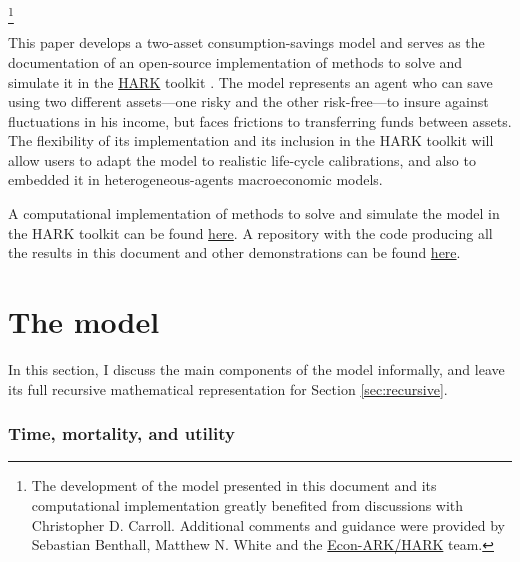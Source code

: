 \documentclass[./RiskyContrib.tex]{subfiles}
\begin{document}
\begin{authorsinfo}
\end{authorsinfo}

\thanks{
The development of the model presented in this document and its computational implementation
greatly benefited from discussions with Christopher D. Carroll. Additional comments and guidance
were provided by Sebastian Benthall, Matthew N. White and the \href{https://econ-ark/HARK}{Econ-ARK/HARK}
team.
}

\titlepagefinish

This paper develops a two-asset consumption-savings model and serves as
the documentation of an open-source implementation of methods to solve and
simulate it in the \href{https://econ-ark.org/toolkit}{HARK}
toolkit \citep{carroll2018HARK}. The model represents an agent who can
save using two different assets---one risky and the other risk-free---to insure
against fluctuations in his income, but faces frictions to transferring funds between
assets. The flexibility of its implementation and its inclusion in the HARK
toolkit will allow users to adapt the model to realistic life-cycle calibrations, and
also to embedded it in heterogeneous-agents macroeconomic models.

A computational implementation of methods to solve and simulate the model in the
HARK toolkit can be found \href{https://github.com/econ-ark/HARK/blob/master/HARK/ConsumptionSaving/ConsRiskyContribModel.py}{here}.
A repository with the code producing all the results in this document and other
demonstrations can be found \href{https://github.com/Mv77/RiskyContrib}{here}.

\hypertarget{The model}{}
\section{The model}

In this section, I discuss the main components of the model informally, and leave its full
recursive mathematical representation for Section \ref{sec:recursive}.

\subsubsection{Time, mortality, and utility}
\end{document}
